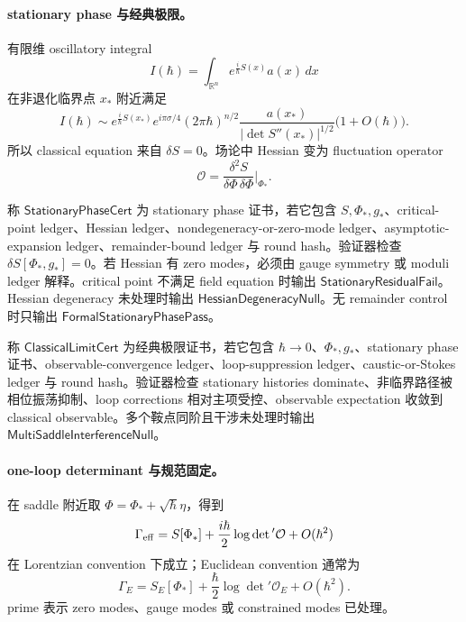 \paragraph{stationary phase 与经典极限。}
有限维 oscillatory integral
\[
I(\hbar)=\int_{\mathbb R^n}e^{\frac{i}{\hbar}S(x)}a(x)\,dx
\]
在非退化临界点 \(x_\ast\) 附近满足
\[
I(\hbar)
\sim
e^{\frac{i}{\hbar}S(x_\ast)}
e^{i\pi\sigma/4}
(2\pi\hbar)^{n/2}
\frac{a(x_\ast)}{|\det S''(x_\ast)|^{1/2}}
\bigl(1+O(\hbar)\bigr).
\]
所以 classical equation 来自 \(\delta S=0\)。场论中 Hessian 变为 fluctuation operator
\[
\mathcal O
=
\frac{\delta^2S}{\delta\Phi\,\delta\Phi}\bigg|_{\Phi_\ast}.
\]

\begin{definition}\label{def:typed-address-biaxial-completion-stationary-phase-cert}
称 \(\mathsf{StationaryPhaseCert}\) 为 stationary phase 证书，若它包含 \(S,\Phi_\ast,g_\ast\)、critical-point ledger、Hessian ledger、nondegeneracy-or-zero-mode ledger、asymptotic-expansion ledger、remainder-bound ledger 与 round hash。验证器检查 \(\delta S[\Phi_\ast,g_\ast]=0\)。若 Hessian 有 zero modes，必须由 gauge symmetry 或 moduli ledger 解释。critical point 不满足 field equation 时输出 \(\mathsf{StationaryResidualFail}\)。Hessian degeneracy 未处理时输出 \(\mathsf{HessianDegeneracyNull}\)。无 remainder control 时只输出 \(\mathsf{FormalStationaryPhasePass}\)。
\end{definition}

\begin{definition}[经典极限证书]\label{def:typed-address-biaxial-completion-classical-limit-cert}
称 \(\mathsf{ClassicalLimitCert}\) 为经典极限证书，若它包含 \(\hbar\to0\)、\(\Phi_\ast,g_\ast\)、stationary phase 证书、observable-convergence ledger、loop-suppression ledger、caustic-or-Stokes ledger 与 round hash。验证器检查 stationary histories dominate、非临界路径被相位振荡抑制、loop corrections 相对主项受控、observable expectation 收敛到 classical observable。多个鞍点同阶且干涉未处理时输出 \(\mathsf{MultiSaddleInterferenceNull}\)。
\end{definition}

\paragraph{one-loop determinant 与规范固定。}
在 saddle 附近取 \(\Phi=\Phi_\ast+\sqrt{\hbar}\eta\)，得到
\[
\Gamma_{\rm eff}
=
S[\Phi_\ast]
+
\frac{i\hbar}{2}\log\det{}'\mathcal O
+
O(\hbar^2)
\]
在 Lorentzian convention 下成立；Euclidean convention 通常为
\[
\Gamma_E
=
S_E[\Phi_\ast]
+
\frac{\hbar}{2}\log\det{}'\mathcal O_E
+
O(\hbar^2).
\]
prime 表示 zero modes、gauge modes 或 constrained modes 已处理。

